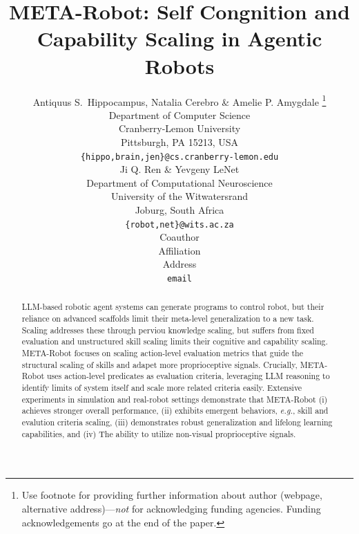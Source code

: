 \documentclass{article} %
\title{META-Robot: Self Congnition and Capability Scaling in Agentic Robots}
\author{Antiquus S.~Hippocampus, Natalia Cerebro \& Amelie P. Amygdale \thanks{ Use footnote for providing further information
about author (webpage, alternative address)---\emph{not} for acknowledging
funding agencies.  Funding acknowledgements go at the end of the paper.} \\
Department of Computer Science\\
Cranberry-Lemon University\\
Pittsburgh, PA 15213, USA \\
\texttt{\{hippo,brain,jen\}@cs.cranberry-lemon.edu} \\
\And
Ji Q. Ren \& Yevgeny LeNet \\
Department of Computational Neuroscience \\
University of the Witwatersrand \\
Joburg, South Africa \\
\texttt{\{robot,net\}@wits.ac.za} \\
\AND
Coauthor \\
Affiliation \\
Address \\
\texttt{email}
}
\begin{document}
\maketitle
\begin{abstract}
LLM-based robotic agent systems can generate programs to control robot, but their reliance on advanced scaffolds limit their meta-level generalization to a new task.
Scaling addresses these through perviou knowledge scaling, but suffers from fixed evaluation and unstructured skill scaling limits their cognitive and capability scaling. 
META-Robot focuses on scaling action-level evaluation metrics that guide the structural scaling of skills and adapet more proprioceptive signals. 
Crucially, META-Robot uses action-level predicates as evaluation criteria, leveraging LLM reasoning to identify limits of system itself and scale more related criteria easily. 
Extensive experiments in simulation and real-robot settings demonstrate that META-Robot (i) achieves stronger overall performance, (ii) exhibits emergent behaviors, \textit{e.g.}, skill and evalution criteria scaling, (iii)  demonstrates robust generalization 
and lifelong learning capabilities, and (iv) The ability to utilize non-visual proprioceptive signals.



\end{abstract}
\end{document}
